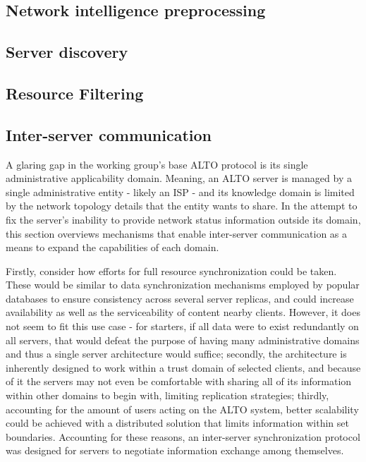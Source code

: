
\subsection{Network intelligence preprocessing}


\subsection{Server discovery}

\subsection{Resource Filtering}

\subsection{Inter-server communication}


    A glaring gap in the working group's base ALTO protocol is its single administrative applicability domain.
    Meaning, an ALTO server is managed by a single administrative entity - likely an ISP - and its knowledge domain is limited by the network topology details that the entity wants to share.
    In the attempt to fix the server's inability to provide network status information outside its domain, this section overviews mechanisms that enable inter-server communication as a means to expand the capabilities of each domain.

    Firstly, consider how efforts for full resource synchronization could be taken.
    These would be similar to data synchronization mechanisms employed by popular databases to ensure consistency across several server replicas, and could increase availability as well as the serviceability of content nearby clients.
    However, it does not seem to fit this use case - for starters, if all data were to exist redundantly on all servers, that would defeat the purpose of having many administrative domains and thus a single server architecture would suffice; secondly, the architecture is inherently designed to work within a trust domain of selected clients, and because of it the servers may not even be comfortable with sharing all of its information within other domains to begin with, limiting replication strategies; thirdly, accounting for the amount of users acting on the ALTO system, better scalability could be achieved with a distributed solution that limits information within set boundaries.
    Accounting for these reasons, an inter-server synchronization protocol was designed for servers to negotiate information exchange among themselves.


\label{ssec:multi-alto}
